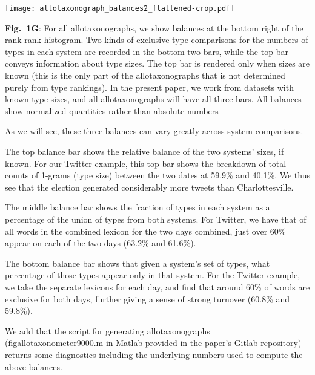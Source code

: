 \begin{center}
  \texttt{[image: allotaxonograph\_balances2\_flattened-crop.pdf]}
\end{center}
\begin{excerpt}
  \textbf{Fig.~1G}:
  For all allotaxonographs, we show balances at the bottom right
  of the rank-rank histogram.
  Two kinds of exclusive type comparisons for the numbers of types in each system
  are recorded in the bottom two bars,
  while the top bar conveys information about type sizes.
  The top bar is rendered only when sizes are known
  (this is the only part of the allotaxonographs that is not
  determined purely from type rankings).
  In the present paper, we work from datasets with known type sizes,
  and all allotaxonographs will have all three bars.
  All balances show normalized quantities rather than absolute numbers

  As we will see, these three balances can vary greatly across system comparisons.

  The top balance bar shows the relative balance of the two systems' sizes, if known.
  For our Twitter example, 
  this top bar shows the breakdown of total counts of 1-grams (type size)
  between the two dates at 59.9\% and 40.1\%.
  We thus see that the election generated considerably more tweets than Charlottesville.

  The middle balance bar shows the fraction of types in each system
  as a percentage of the union of types from both systems.
  For Twitter, we have that of all words in the combined lexicon for the two days combined,
  just over 60\% appear on each of the two days (63.2\% and 61.6\%).

  The bottom balance bar shows that given a system's set of types,
  what percentage of those types appear only in that system.
  For the Twitter example, we take the  separate lexicons for each day,
  and find that around 60\% of words are exclusive for both days,
  further giving a sense of strong turnover (60.8\% and 59.8\%).

  We add that the script for generating allotaxonographs
  (figallotaxonometer9000.m in Matlab provided in the paper's Gitlab repository)
  returns some diagnostics
  including the underlying numbers used to compute the above balances.
\end{excerpt}





